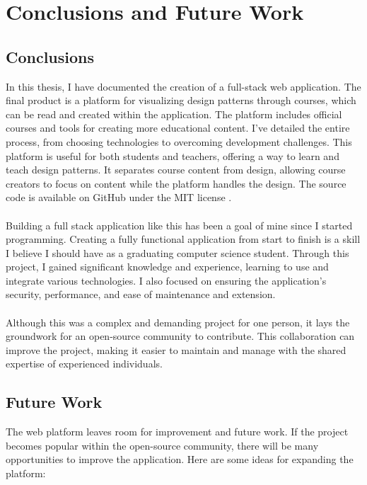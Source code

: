 \chapter{Conclusions and Future Work}

\section{Conclusions}

In this thesis, I have documented the creation of a full-stack web application. The final product is a platform for visualizing design patterns through courses, which can be read and created within the application. The platform includes official courses and tools for creating more educational content. I've detailed the entire process, from choosing technologies to overcoming development challenges. This platform is useful for both students and teachers, offering a way to learn and teach design patterns. It separates course content from design, allowing course creators to focus on content while the platform handles the design. The source code is available on GitHub under the MIT license \cite{designoop}.
\\\\
\noindent Building a full stack application like this has been a goal of mine since I started programming. Creating a fully functional application from start to finish is a skill I believe I should have as a graduating computer science student. Through this project, I gained significant knowledge and experience, learning to use and integrate various technologies. I also focused on ensuring the application's security, performance, and ease of maintenance and extension.
\\\\
\noindent Although this was a complex and demanding project for one person, it lays the groundwork for an open-source community to contribute. This collaboration can improve the project, making it easier to maintain and manage with the shared expertise of experienced individuals.

\newpage
\section{Future Work}

The web platform leaves room for improvement and future work. If the project becomes popular within the open-source community, there will be many opportunities to improve the application. Here are some ideas for expanding the platform:


